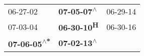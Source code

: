 \begin{supertabular}{lll}
                   06-27-02\textsuperscript{} &  \textbf{07-05-07\textsuperscript{$\wedge$}} &  06-29-14\textsuperscript{} \\
                   07-03-04\textsuperscript{} &         \textbf{06-30-10\textsuperscript{H}} &  06-30-16\textsuperscript{} \\
 \textbf{07-06-05\textsuperscript{$\wedge$*}} &  \textbf{07-02-13\textsuperscript{$\wedge$}} &                             \\
\end{supertabular}
